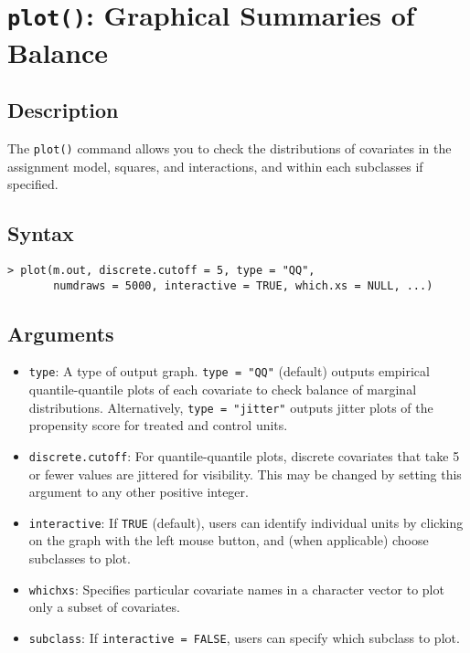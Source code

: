 \section{\texttt{plot()}: Graphical Summaries of Balance}

\subsection{Description}
The \texttt{plot()} command allows you to check the distributions of
covariates in the assignment model, squares, and interactions, and
within each subclasses if specified.  

\subsection{Syntax}

\begin{verbatim}
> plot(m.out, discrete.cutoff = 5, type = "QQ", 
       numdraws = 5000, interactive = TRUE, which.xs = NULL, ...)
\end{verbatim}

\subsection{Arguments}

\begin{itemize}
\item {\tt type}: A type of output graph. \texttt{type = "QQ"}
  (default) outputs empirical quantile-quantile plots of each
  covariate to check balance of marginal distributions. Alternatively,
  \texttt{type = "jitter"} outputs jitter plots of the propensity
  score for treated and control units.
  
\item {\tt discrete.cutoff}: For quantile-quantile plots, discrete
  covariates that take 5 or fewer values are jittered for visibility.
  This may be changed by setting this argument to any other positive
  integer.
  
\item {\tt interactive}: If \texttt{TRUE} (default), users can
  identify individual units by clicking on the graph with the left
  mouse button, and (when applicable) choose subclasses to plot.
  
\item {\tt whichxs}: Specifies particular covariate names in a
  character vector to plot only a subset of covariates.

\item {\tt subclass}: If \texttt{interactive = FALSE}, users can
  specify which subclass to plot. 

\end{itemize}

